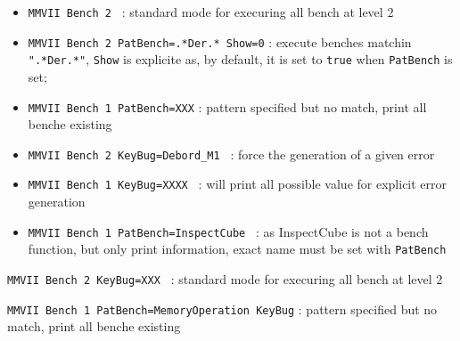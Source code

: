 \begin{itemize}
    \item {\tt  MMVII Bench 2 }  : standard mode  for execuring all bench at level 2

    \item {\tt MMVII Bench 2 PatBench=.*Der.* Show=0}  : execute benches matchin {\tt ".*Der.*"},
          {\tt  Show} is explicite as, by default, it is set to {\tt  true} 
          when {\tt  PatBench} is set;
   
    \item {\tt MMVII Bench 1 PatBench=XXX} : pattern specified but no match, print all benche existing


    \item {\tt MMVII Bench 2 KeyBug=Debord\_M1 }  : force the generation of  a given error

    \item {\tt MMVII Bench 1 KeyBug=XXXX }  : will print all possible value for explicit error generation


    \item {\tt MMVII Bench 1 PatBench=InspectCube }  : as InspectCube is not a bench function, but 
         only print information, exact name must be set with {\tt PatBench}

\end{itemize}






{\tt MMVII Bench 2 KeyBug=XXX }  : standard mode  for execuring all bench at level 2

{\tt MMVII Bench 1 PatBench=MemoryOperation KeyBug} : pattern specified but no match, print all benche existing

